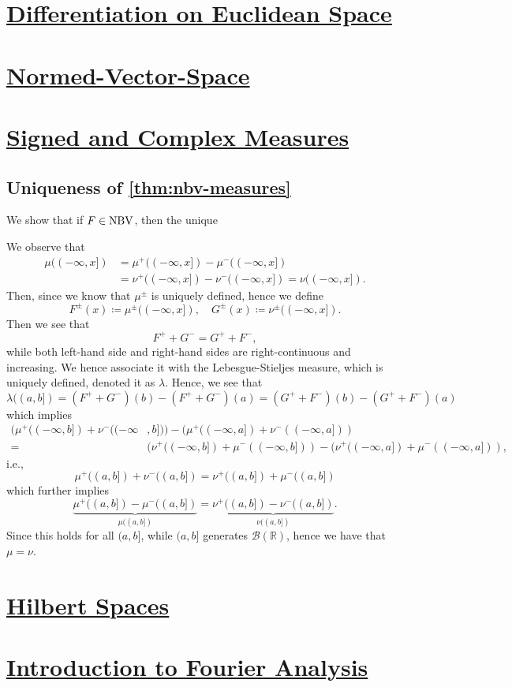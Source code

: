 \section{\hyperref[ch:Differentiation-on-Euclidean-Space]{Differentiation on Euclidean Space}}

\section{\hyperref[ch:Normed-Vector-Space]{Normed-Vector-Space}}

\section{\hyperref[ch:Signed-and-Complex-Measures]{Signed and Complex Measures}}
\subsection{Uniqueness of \autoref{thm:nbv-measures}}\label{pf:thm:nbv-measures-uniqueness}
\begin{claim}
	We show that if \(F\in \operatorname{NBV}\), then the unique
\end{claim}
\begin{explanation}
	We observe that
	\[
		\begin{split}
			\mu ((-\infty , x]) & = \mu^+ ((-\infty , x]) - \mu ^- ((-\infty , x])                       \\
			                    & = \nu ^+((-\infty , x]) - \nu ^-((-\infty , x]) = \nu ((-\infty , x]).
		\end{split}
	\]
	Then, since we know that \(\mu ^\pm\) is uniquely defined, hence we define
	\[
		F^\pm (x) \coloneqq  \mu ^\pm ((-\infty , x]),\quad G^\pm (x) \coloneqq \nu ^\pm ((-\infty , x]).
	\]
	Then we see that
	\[
		F^+ + G^- = G^+ + F^-,
	\]
	while both left-hand side and right-hand sides are right-continuous and increasing. We hence associate it with the Lebesgue-Stieljes measure, which is
	uniquely defined, denoted it as \(\lambda \). Hence, we see that
	\[
		\lambda ((a, b]) = (F^+ + G^-)(b) - (F^+ + G^-)(a) = (G^+ + F^-)(b) - (G^+ + F^-)(a)
	\]
	which implies
	\[
		\begin{split}
			(\mu ^+((-\infty , b]) + \nu ^-((-\infty & , b])) - (\mu ^+((-\infty , a]) + \nu ^-((-\infty , a]))                                           \\
			=                                        & (\nu ^+((-\infty , b]) + \mu ^-((-\infty , b])) - (\nu ^+((-\infty , a]) + \mu ^-((-\infty , a])),
		\end{split}
	\]
	i.e.,
	\[
		\mu ^+((a, b]) + \nu ^-((a, b]) = \nu ^+((a, b]) + \mu ^-((a, b])
	\]
	which further implies
	\[
		\underbrace{\mu ^+((a, b]) - \mu ^-((a, b])}_{\mu ((a, b])} = \underbrace{\nu ^+((a, b]) - \nu ^-((a, b])}_{\nu ((a, b])}.
	\]
	Since this holds for all \((a, b]\), while \((a, b]\) generates \(\mathcal{B} (\mathbb{R} )\), hence
	we have that \(\mu = \nu \).
\end{explanation}
\section{\hyperref[ch:Hilbert-Spaces]{Hilbert Spaces}}

\section{\hyperref[ch:Introduction-to-Fourier-Analysis]{Introduction to Fourier Analysis}}